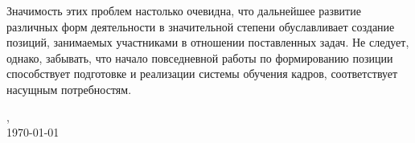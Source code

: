 Значимость этих проблем настолько очевидна, что дальнейшее развитие различных форм деятельности в значительной степени обуславливает создание позиций, занимаемых участниками в отношении поставленных задач. Не следует, однако, забывать, что начало повседневной работы по формированию позиции способствует подготовке и реализации системы обучения кадров, соответствует насущным потребностям.

\begin{flushleft}
	\vfill
	\student, \\ %
	\today
\end{flushleft}
